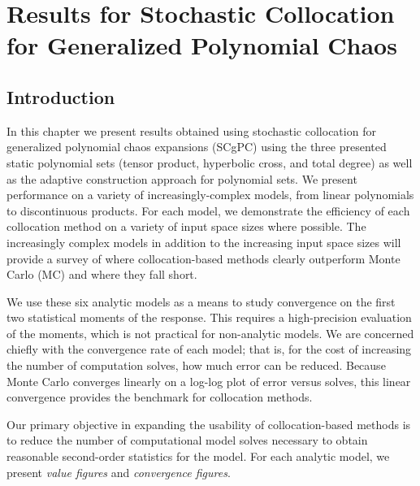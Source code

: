
\chapter{Results for Stochastic Collocation for Generalized Polynomial Chaos} %

\label{ch:results scgpc} %



\section{Introduction}
In this chapter we present results obtained using stochastic collocation for generalized polynomial chaos
expansions (SCgPC) using the three presented static polynomial sets (tensor product, hyperbolic cross, and
total degree) as well as the adaptive construction approach for polynomial sets.  We present performance on 
a variety of increasingly-complex
models, from linear polynomials to discontinuous products.  For each model, we demonstrate the
efficiency of each collocation method on a variety of input space sizes where possible.  The increasingly
complex models in addition to the increasing input space sizes will provide a survey of where
collocation-based methods clearly outperform Monte Carlo (MC) and where they fall short.

We use these six analytic models as a means to study convergence on the first two statistical moments of the
response.  This requires a high-precision evaluation of the moments, which is not practical for non-analytic
models.  We are concerned chiefly with the convergence rate of each model; that is, for the cost of increasing
the number of computation solves, how much error can be reduced.  Because Monte Carlo converges linearly on a
log-log plot of error versus solves, this linear convergence provides the benchmark for collocation methods.

Our primary objective in expanding the usability of collocation-based methods is to reduce the number of
computational model solves necessary to obtain reasonable second-order statistics for the model.  For each
analytic model, we present \emph{value figures} and \emph{convergence figures}.  

